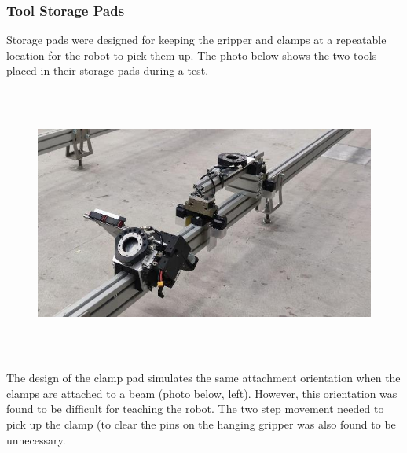 \documentclass[11pt]{book}
\begin{document}
\subsubsection{Tool Storage Pads}

Storage pads were designed for keeping the gripper and clamps at a repeatable location for the robot to pick them up. The photo below shows the two tools placed in their storage pads during a test. 

\begin{figure}[H]
\includegraphics[width=15.92cm,height=8.96cm]{./images/image2.jpeg}
\end{figure}


The design of the clamp pad simulates the same attachment orientation when the clamps are attached to a beam (photo below, left). However, this orientation was found to be difficult for teaching the robot. The two step movement needed to pick up the clamp (to clear the pins on the hanging gripper was also found to be unnecessary. 
\end{document}

